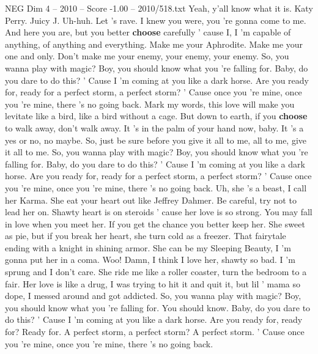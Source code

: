 \begin{textsample}{NEG Dim 4 – 2010 – Score -1.00 – 2010/518.txt}  \label{ex:f4_neg_010}
Yeah, y'all know what it is.
Katy Perry.
Juicy J.
Uh-huh.
Let 's rave.
I knew you were, you 're gonna come to me.
And here you are, but you better \textbf{choose} carefully ' cause I, I 'm capable of anything, of anything and everything.
Make me your Aphrodite.
Make me your one and only.
Don't make me your enemy, your enemy, your enemy.
So, you wanna play with magic?
Boy, you should know what you 're falling for.
Baby, do you dare to do this? ' Cause I 'm coming at you like a dark horse.
Are you ready for, ready for a perfect storm, a perfect storm? ' Cause once you 're mine, once you 're mine, there 's no going back.
Mark my words, this love will make you levitate like a bird, like a bird without a cage.
But down to earth, if you \textbf{choose} to walk away, don't walk away.
It 's in the palm of your hand now, baby.
It 's a yes or no, no maybe.
So, just be sure before you give it all to me, all to me, give it all to me.
So, you wanna play with magic?
Boy, you should know what you 're falling for.
Baby, do you dare to do this? ' Cause I 'm coming at you like a dark horse.
Are you ready for, ready for a perfect storm, a perfect storm? ' Cause once you 're mine, once you 're mine, there 's no going back.
Uh, she 's a beast, I call her Karma.
She eat your heart out like Jeffrey Dahmer.
Be careful, try not to lead her on.
Shawty heart is on steroids ' cause her love is so strong.
You may fall in love when you meet her.
If you get the chance you better keep her.
She sweet as pie, but if you break her heart, she turn cold as a freezer.
That fairytale ending with a knight in shining armor.
She can be my Sleeping Beauty, I 'm gonna put her in a coma.
Woo!
Damn, I think I love her, shawty so bad.
I 'm sprung and I don't care.
She ride me like a roller coaster, turn the bedroom to a fair.
Her love is like a drug, I was trying to hit it and quit it, but lil ' mama so dope, I messed around and got addicted.
So, you wanna play with magic?
Boy, you should know what you 're falling for.
You should know.
Baby, do you dare to do this? ' Cause I 'm coming at you like a dark horse.
Are you ready for, ready for?
Ready for.
A perfect storm, a perfect storm?
A perfect storm. ' Cause once you 're mine, once you 're mine, there 's no going back.

\end{textsample}
